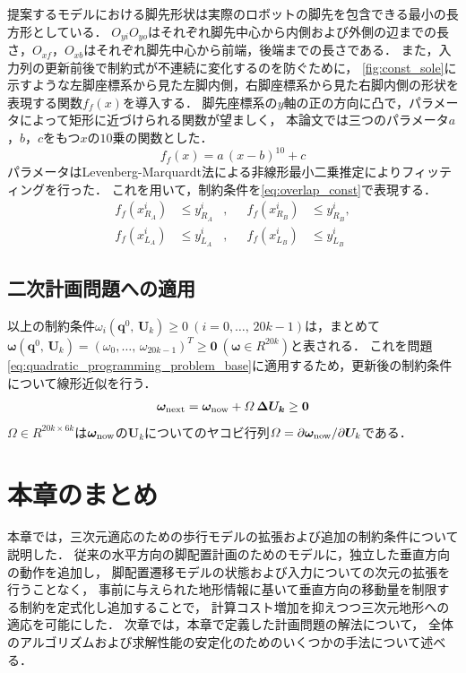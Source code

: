 \documentclass[autodetect-engine,dvipdfmx-if-dvi,ja=standard,a4j,jbase=11pt,magstyle=nomag*]{bxjsreport}
\begin{document}
%
提案するモデルにおける脚先形状は実際のロボットの脚先を包含できる最小の長方形としている．
$O_{yi}$$O_{yo}$はそれぞれ脚先中心から内側および外側の辺までの長さ，$O_{xf}$，$O_{xb}$はそれぞれ脚先中心から前端，後端までの長さである．
また，入力列の更新前後で制約式が不連続に変化するのを防ぐために，
\cref{fig:const_sole}に示すような左脚座標系から見た左脚内側，右脚座標系から見た右脚内側の形状を表現する関数$f_f ( x )$を導入する．
%
脚先座標系の$y$軸の正の方向に凸で，パラメータによって矩形に近づけられる関数が望ましく，
本論文では三つのパラメータ$a$，$b$，$c$をもつ$x$の$10$乗の関数とした．
\begin{equation} \label{eq:foot_shape}
    f_f ( x ) = a \, ( x - b )^{10} + c
\end{equation}
パラメータはLevenberg-Marquardt法による非線形最小二乗推定によりフィッティングを行った．
これを用いて，制約条件を\cref{eq:overlap_const}で表現する．
\begin{equation} \label{eq:overlap_const}
    \begin{aligned} 
        f_f \left( x_{R_A}^i \right) & \leq y_{R_A}^i &,&& f_f \left( x_{R_B}^i \right) & \leq y_{R_B}^i , \\ 
        f_f \left( x_{L_A}^i \right) & \leq y_{L_A}^i &,&& f_f \left( x_{L_B}^i \right) & \leq y_{L_B}^i
    \end{aligned}
\end{equation}

\subsection{二次計画問題への適用}
以上の制約条件$\omega_i(\bm{q}^0 ,\, \bm{U}_k) \geq 0 \ (i = 0 , \dots ,\, 20k - 1)$は，まとめて$\bm{\omega} ( \bm{q}^0 ,\, \bm{U}_k ) = ( \omega_0 , \dots ,\, \omega_{20 k - 1} )^T \geq \bm{0}\ ( \bm{\omega }\in R^{20k} )$と表される．
これを問題\cref{eq:quadratic_programming_problem_base}に適用するため，更新後の制約条件について線形近似を行う．
\begin{equation}\begin{aligned} 
    \bm{\omega}_{\mathrm{next}} = \bm{\omega}_{\mathrm{now}} + \varOmega \, \bm{\Delta U_k} \geq \bm{0}
\end{aligned}\end{equation}
$\varOmega \in R^{20k \times 6k}$は$\bm{\omega}_{\mathrm{now}}$の$\bm{U}_k$についてのヤコビ行列$\varOmega = \partial \bm{\omega}_{\mathrm{now}} / \partial \bm{U}_k$である．


\section{本章のまとめ}
本章では，三次元適応のための歩行モデルの拡張および追加の制約条件について説明した．
従来の水平方向の脚配置計画のためのモデルに，独立した垂直方向の動作を追加し，
脚配置遷移モデルの状態および入力についての次元の拡張を行うことなく，
事前に与えられた地形情報に基いて垂直方向の移動量を制限する制約を定式化し追加することで，
計算コスト増加を抑えつつ三次元地形への適応を可能にした．
次章では，本章で定義した計画問題の解法について，
全体のアルゴリズムおよび求解性能の安定化のためのいくつかの手法について述べる．
\end{document}
